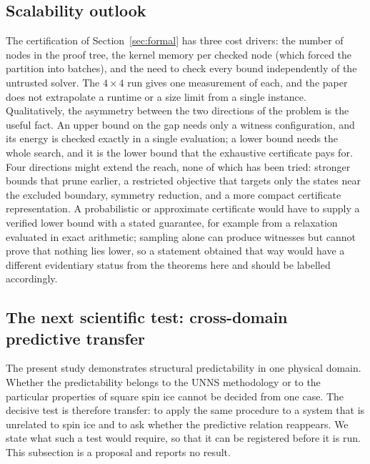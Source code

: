 \documentclass[11pt,a4paper]{article}
\theoremstyle{plain}
\theoremstyle{definition}
\theoremstyle{remark}
\begin{document}
\subsection{Scalability outlook}
The certification of Section~\ref{sec:formal} has three cost drivers: the number of nodes in the proof tree, the kernel memory per checked node (which forced the partition into batches), and the need to check every bound independently of the untrusted solver. The $4\times4$ run gives one measurement of each, and the paper does not extrapolate a runtime or a size limit from a single instance. Qualitatively, the asymmetry between the two directions of the problem is the useful fact. An upper bound on the gap needs only a witness configuration, and its energy is checked exactly in a single evaluation; a lower bound needs the whole search, and it is the lower bound that the exhaustive certificate pays for. Four directions might extend the reach, none of which has been tried: stronger bounds that prune earlier, a restricted objective that targets only the states near the excluded boundary, symmetry reduction, and a more compact certificate representation. A probabilistic or approximate certificate would have to supply a verified lower bound with a stated guarantee, for example from a relaxation evaluated in exact arithmetic; sampling alone can produce witnesses but cannot prove that nothing lies lower, so a statement obtained that way would have a different evidentiary status from the theorems here and should be labelled accordingly.

\subsection{The next scientific test: cross-domain predictive transfer}\label{sec:transfer}
The present study demonstrates structural predictability in one physical domain. Whether the predictability belongs to the UNNS methodology or to the particular properties of square spin ice cannot be decided from one case. The decisive test is therefore transfer: to apply the same procedure to a system that is unrelated to spin ice and to ask whether the predictive relation reappears. We state what such a test would require, so that it can be registered before it is run. This subsection is a proposal and reports no result.
\end{document}
